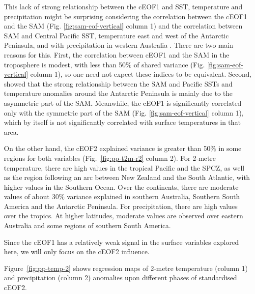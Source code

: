 \documentclass[pdflatex,sn-basic]{sn-jnl}
\theoremstyle{thmstyleone}%
\theoremstyle{thmstyletwo}%
\theoremstyle{thmstylethree}%
\begin{document}
This lack of strong relationship between the cEOF1 and SST, temperature and precipitation might be surprising considering the correlation between the cEOF1 and the SAM (Fig. \ref{fig:sam-eof-vertical} column 1) and the correlation between SAM and Central Pacific SST, temperature east and west of the Antarctic Peninsula, and with precipitation in western Australia \citep{fogt2020}.
There are two main reasons for this.
First, the correlation between cEOF1 and the SAM in the troposphere is modest, with less than 50\% of shared variance (Fig. \ref{fig:sam-eof-vertical} column 1), so one need not expect these indices to be equivalent.
Second, \citet{campitelli2022} showed that the strong relationship between the SAM and Pacific SSTs and temperature anomalies around the Antarctic Peninsula is mainly due to the asymmetric part of the SAM.
Meanwhile, the cEOF1 is significantly correlated only with the symmetric part of the SAM (Fig. \ref{fig:sam-eof-vertical} column 1), which by itself is not significantly correlated with surface temperatures in that area.

On the other hand, the cEOF2 explained variance is greater than 50\% in some regions for both variables (Fig.~\ref{fig:pp-t2m-r2} column 2).
For 2-metre temperature, there are high values in the tropical Pacific and the SPCZ, as well as the region following an arc between New Zealand and the South Atlantic, with higher values in the Southern Ocean.
Over the continents, there are moderate values of about 30\% variance explained in southern Australia, Southern South America and the Antarctic Peninsula.
For precipitation, there are high values over the tropics. At higher latitudes, moderate values are observed over eastern Australia and some regions of southern South America.

Since the cEOF1 has a relatively weak signal in the surface variables explored here, we will only focus on the cEOF2 influence.

Figure~\ref{fig:pp-temp-2} shows regression maps of 2-metre temperature (column 1) and precipitation (column 2) anomalies upon different phases of standardised cEOF2.
\end{document}
